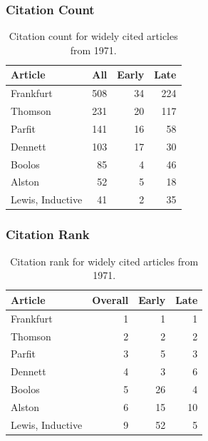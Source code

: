 \documentclass[
  10pt,
  letterpaper,
  DIV=11,
  numbers=noendperiod,
  twoside]{scrartcl}
\begin{document}
\subsubsection*{Citation Count}\label{sec-count-1971}

\begin{longtable}[]{@{}lrrr@{}}

\caption{\label{tbl-citation-count-1971}Citation count for widely cited
articles from 1971.}

\tabularnewline

\toprule\noalign{}
Article & All & Early & Late \\
\midrule\noalign{}
\endhead
\bottomrule\noalign{}
\endlastfoot
Frankfurt & 508 & 34 & 224 \\
Thomson & 231 & 20 & 117 \\
Parfit & 141 & 16 & 58 \\
Dennett & 103 & 17 & 30 \\
Boolos & 85 & 4 & 46 \\
Alston & 52 & 5 & 18 \\
Lewis, Inductive & 41 & 2 & 35 \\

\end{longtable}

\subsubsection*{Citation Rank}\label{sec-rank-1971}

\begin{longtable}[]{@{}lrrr@{}}

\caption{\label{tbl-citation-rank-1971}Citation rank for widely cited
articles from 1971.}

\tabularnewline

\toprule\noalign{}
Article & Overall & Early & Late \\
\midrule\noalign{}
\endhead
\bottomrule\noalign{}
\endlastfoot
Frankfurt & 1 & 1 & 1 \\
Thomson & 2 & 2 & 2 \\
Parfit & 3 & 5 & 3 \\
Dennett & 4 & 3 & 6 \\
Boolos & 5 & 26 & 4 \\
Alston & 6 & 15 & 10 \\
Lewis, Inductive & 9 & 52 & 5 \\

\end{longtable}
\end{document}
